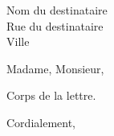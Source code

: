\documentclass{letter}
\begin{document}
\begin{letter}{Nom du destinataire \\ Rue du destinataire \\ Ville}
\opening{Madame, Monsieur,}

Corps de la lettre.

\closing{Cordialement,}

\end{letter}
\end{document}
